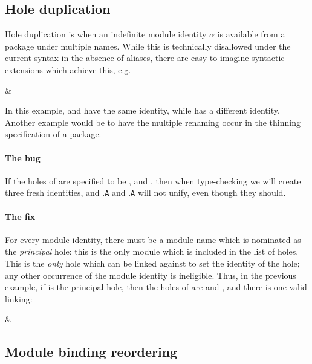 \documentclass{article}
\begin{document}
\subsection{Hole duplication}

Hole duplication is when an indefinite module identity $\alpha$ is
available from a package under multiple names.  While this is
technically disallowed under the current syntax in the absence of
aliases, there are easy to imagine syntactic extensions which achieve
this, e.g.

\begin{example}
 &
\end{example}

In this example,  and  have the same identity, while 
has a different identity.  Another example would be to have the multiple
renaming occur in the thinning specification of a package.

\paragraph{The bug} If the holes of  are specified to be
,  and , then when type-checking  we will
create three fresh identities, and .\verb|A| and .\verb|A|
will not unify, even though they should.

\paragraph{The fix} For every module identity, there must be a module
name which is nominated as the \emph{principal} hole: this is the only
module which is included in the list of holes.  This is the \emph{only}
hole which can be linked against to set the identity of the hole; any
other occurrence of the module identity is ineligible.  Thus, in the
previous example, if  is the principal hole, then the holes of
 are  and , and there is one valid linking:

\begin{example}
 &
\end{example}

\subsection{Module binding reordering}
\end{document}
